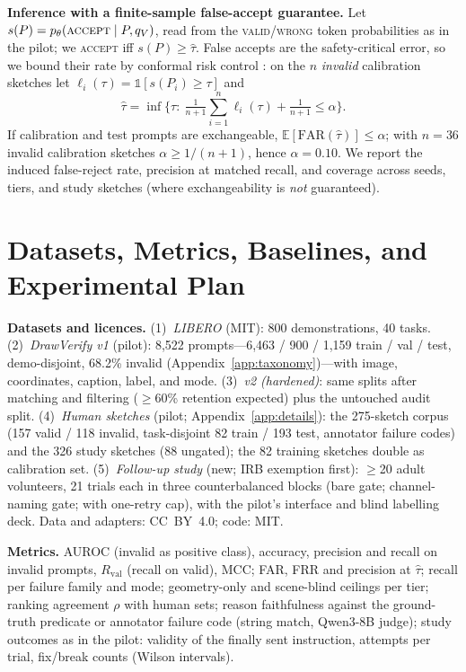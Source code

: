 \documentclass{article} %
\newcommand{\accept}{\textsc{accept}}
\newcommand{\dvv}{DrawVerify}
\begin{document}
\textbf{Inference with a finite-sample false-accept guarantee.} Let $s(P)=p_\theta(\accept\mid P,q_V)$, read from the \textsc{valid}/\textsc{wrong} token probabilities as in the pilot; we \accept{} iff $s(P)\ge\hat\tau$. False accepts are the safety-critical error, so we bound their rate by conformal risk control \citep{angelopoulos2024conformalrisk}: on the $n$ \emph{invalid} calibration sketches let $\ell_i(\tau)=\mathbb{1}[s(P_i)\ge\tau]$ and
\begin{equation}
\hat\tau=\inf\big\{\tau:\ \tfrac{1}{n+1}\textstyle\sum_{i=1}^{n}\ell_i(\tau)+\tfrac{1}{n+1}\le\alpha\big\}.
\label{eq:crc}
\end{equation}
If calibration and test prompts are exchangeable, $\mathbb{E}[\mathrm{FAR}(\hat\tau)]\le\alpha$; with $n=36$ invalid calibration sketches $\alpha\ge1/(n{+}1)$, hence $\alpha=0.10$. We report the induced false-reject rate, precision at matched recall, and coverage across seeds, tiers, and study sketches (where exchangeability is \emph{not} guaranteed).

\section{Datasets, Metrics, Baselines, and Experimental Plan}
\label{sec:plan}

\textbf{Datasets and licences.} (1)~\emph{LIBERO} \citep{liu2023libero} (MIT): 800 demonstrations, 40 tasks. (2)~\emph{\dvv{} v1} (pilot): 8,522 prompts---6,463 / 900 / 1,159 train / val / test, demo-disjoint, 68.2\% invalid (Appendix~\ref{app:taxonomy})---with image, coordinates, caption, label, and mode. (3)~\emph{v2 (hardened)}: same splits after matching and filtering ($\ge$60\% retention expected) plus the untouched audit split. (4)~\emph{Human sketches} (pilot; Appendix~\ref{app:details}): the 275-sketch corpus (157 valid / 118 invalid, task-disjoint 82 train / 193 test, annotator failure codes) and the 326 study sketches (88 ungated); the 82 training sketches double as calibration set. (5)~\emph{Follow-up study} (new; IRB exemption first): $\ge$20 adult volunteers, 21 trials each in three counterbalanced blocks (bare gate; channel-naming gate; with one-retry cap), with the pilot's interface and blind labelling deck. Data and adapters: CC~BY~4.0; code: MIT.

\textbf{Metrics.} AUROC (invalid as positive class), accuracy, precision and recall on invalid prompts, $R_{\mathrm{val}}$ (recall on valid), MCC; FAR, FRR and precision at $\hat\tau$; recall per failure family and mode; geometry-only and scene-blind ceilings per tier; ranking agreement $\rho$ with human sets; reason faithfulness against the ground-truth predicate or annotator failure code (string match, Qwen3-8B judge); study outcomes as in the pilot: validity of the finally sent instruction, attempts per trial, fix/break counts (Wilson intervals).
\end{document}

